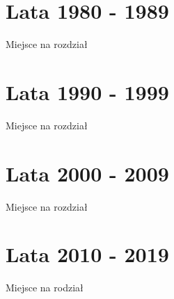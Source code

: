 \documentclass[
]{book}
\begin{document}
\hypertarget{lata-1980---1989}{%
\chapter{Lata 1980 - 1989}\label{lata-1980---1989}}

Miejsce na rozdział

\hypertarget{lata-1990---1999}{%
\chapter{Lata 1990 - 1999}\label{lata-1990---1999}}

Miejsce na rozdział

\hypertarget{lata-2000---2009}{%
\chapter{Lata 2000 - 2009}\label{lata-2000---2009}}

Miejsce na rozdział

\hypertarget{lata-2010---2019}{%
\chapter{Lata 2010 - 2019}\label{lata-2010---2019}}

Miejsce na rodział

  
\end{document}

